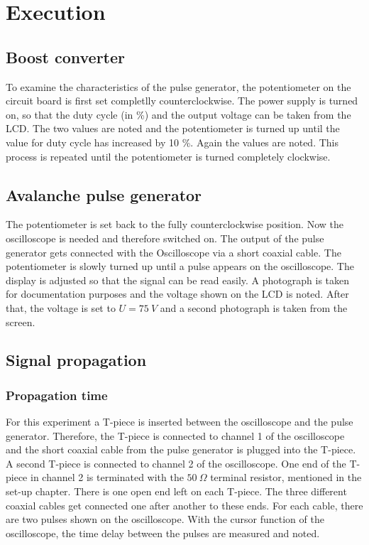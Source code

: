 \chapter{Execution}
    \section{Boost converter}
        To examine the characteristics of the pulse generator, the potentiometer on the circuit board is first set completlly
        counterclockwise. The power supply is turned on, so that the duty cycle (in \%) and the output voltage can be taken from
        the LCD. The two values are noted and the potentiometer is turned up until the value for duty cycle has increased by 10 \%.
        Again the values are noted. This process is repeated until the potentiometer is turned completely clockwise.
    \section{Avalanche pulse generator}
        The potentiometer is set back to the fully counterclockwise position. Now the oscilloscope is needed and therefore
        switched on. The output of the pulse generator gets connected with the Oscilloscope via a short coaxial cable. The
        potentiometer is slowly turned up until a pulse appears on the oscilloscope. The display is adjusted so that the signal
        can be read easily. A photograph is taken for documentation purposes and the voltage shown on the LCD is noted. After
        that, the voltage is set to \(U = \SI[]{75}[]{V}\) and a second photograph is taken from the screen.
    \section{Signal propagation}
        \subsection{Propagation time}
            For this experiment a T-piece is inserted between the oscilloscope and the pulse generator. Therefore, the T-piece is
            connected to channel 1 of the oscilloscope and the short coaxial cable from the pulse generator is plugged into the
            T-piece. A second T-piece is connected to channel 2 of the oscilloscope. One end of the T-piece in channel 2 is terminated
            with the \(50\ \Omega\) terminal resistor, mentioned in the set-up chapter. There is one open end left on each T-piece.
            The three different coaxial cables get connected one after another to these ends. For each cable, there are two pulses
            shown on the oscilloscope. With the cursor function of the oscilloscope, the time delay between the pulses are measured
            and noted.
